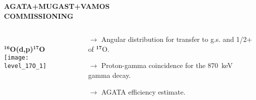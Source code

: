 \documentclass[10pt]{beamer}
\begin{document}
\begin{frame}
\centering
\vspace{-0.15\textheight}
\textbf{AGATA+MUGAST+VAMOS\\ COMMISSIONING}
\vspace{0.05\textheight}
\begin{columns}
	\begin{column}{0.5\textwidth}
		\begin{overlayarea}{\textwidth}{0.5\textheight}
			\center
			\\
			\vspace{0.02\textheight}
			\textbf{\large$\mathbf{^{16}}$O(d,p)$\mathbf{^{17}}$O}\\
			\vspace{0.02\textheight}
			\texttt{[image: level\_17O\_1]}
		\end{overlayarea}
	\end{column}
	\begin{column}{0.5\textwidth}
		\begin{overlayarea}{\textwidth}{0.5\textheight}
			\center
			\vspace{0.05\textheight}
			\begin{itemize}
				\item[$\rightarrow$]Angular distribution for transfer to g.s. and 1/2+ of $\mathbf{^{17}}$O.
				\item[$\rightarrow$]Proton-gamma coincidence for the 870~keV gamma decay.
				\item[$\rightarrow$]AGATA efficiency estimate.
			\end{itemize}
		\end{overlayarea}
	\end{column}
\end{columns}

\end{frame}
\end{document}
